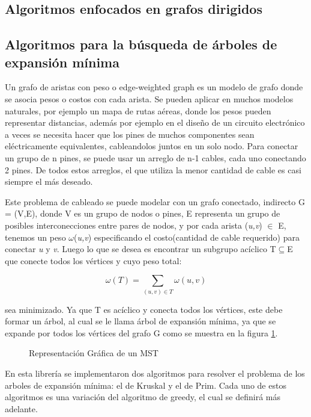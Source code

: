 \documentclass[a4paper, 11pt]{report}
\newcommand{\DrawEJGraph}[5]{

    \begin{scope}[#4]
    \foreach \pos/\nodo in {{(0,0)/4}, {(0,2.2)/5}, {(1.5,1.7)/7}, {(3,3)/1}, {(3,1)/0}, {(4.5,1.7)/2}, {(4.5,3)/3}, {(7,0)/6}}
        \node[vertex] (#3\nodo) at \pos {\nodo};

    \foreach \start/\end/\weight in {4/5/0.35, 5/7/0.28, 7/1/0.19,7/0/0.16,0/2/0.26,2/3/0.17,2/6/0.40,4/7/0.37,1/5/0.32,0/4/0.38,1/2/0.36,1/3/0.29,2/7/0.34,3/6/0.52,6/0/0.58,6/4/0.93}
        \path[edge,#5] (#3\start) --node[weight,midway,fill=white] {$\weight$} (#3\end);

    \foreach \nodo in {#1}
        \node[selected vertex] at (#3\nodo) {\nodo};

    \begin{pgfonlayer}{background}
        \foreach \start/\end in {#2}
            \path[selected edge,#5] (#3\start) -- (#3\end);
    \end{pgfonlayer}
    \end{scope}

}
\begin{document}
\subsection{Algoritmos enfocados en grafos dirigidos}
\newpage
\subsection{Algoritmos para la b\'usqueda de \'arboles de expansi\'on m\'inima}
Un grafo de aristas con peso o edge-weighted graph es un modelo de grafo donde se asocia pesos o costos con cada arista. Se pueden aplicar en muchos modelos naturales, por ejemplo un mapa de rutas aéreas, donde los pesos pueden representar distancias, además por ejemplo en el diseño de un circuito electrónico a veces se necesita hacer que los pines  de muchos componentes sean eléctricamente equivalentes, cableandolos juntos en un solo nodo. Para conectar un grupo de n pines, se puede usar un arreglo de n-1 cables, cada uno conectando 2 pines. De todos estos arreglos, el que utiliza la menor cantidad de cable es casi siempre el más deseado. 

Este problema de cableado se puede modelar con un grafo conectado, indirecto G = (V,E), donde V es un grupo de nodos o pines, E representa un grupo de posibles interconecciones entre pares de nodos, y por cada arista (\textit{u,v}) $\in$  E, tenemos un peso $\omega$(\textit{u,v}) especificando el costo(cantidad de cable requerido) para conectar \textit{u} y \textit{v}. Luego lo que se desea es encontrar un subgrupo acíclico T$ \subseteq $E que conecte todos los vértices y cuyo peso total:

\begin{equation}
 \omega (T) =  \sum_{(u,v) \in T}  \omega (u,v) 
\end{equation}

sea minimizado. Ya que T es acíclico y conecta todos los vértices, este debe formar un árbol, al cual se le llama árbol de expansión mínima, ya que se expande por todos los vértices del grafo G como se muestra en la figura \ref{MST1}. 


\begin{figure}[!h]
    \centering
    \caption{Representaci\'on Gr\'afica de un MST}
    \label{MST1}
\end{figure}

En esta librería se implementaron dos algoritmos para resolver el problema de los arboles de expansión mínima: el de Kruskal y el de Prim. Cada uno de estos algoritmos es una variación del algoritmo de greedy, el cual se definirá más adelante. 
\end{document}
